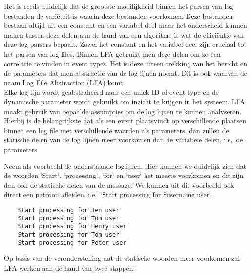 Het is reeds duidelijk dat de grootste moeilijkheid binnen het parsen van log bestanden de variëteit is waarin deze bestanden voorkomen. Deze bestanden bestaan altijd uit een constant en een variabel deel maar het onderscheid kunnen maken tussen deze delen aan de hand van een algoritme is wat de efficiëntie van deze log parsers bepaalt. Zowel het constant en het variabel deel zijn cruciaal tot het parsen van log files. Binnen LFA gebruikt men deze delen om zo een correlatie te vinden in event types. Het is deze uiteen trekking van het bericht en de parameters dat men abstractie van de log lijnen noemt. Dit is ook waarvan de naam Log File Abstraction (LFA) komt.\\

Elke log lijn wordt geabstraheerd naar een uniek ID of event type en de dynamische parameter wordt gebruikt om inzicht te krijgen in het systeem. LFA maakt gebruik van bepaalde assumpties om de log lijnen te kunnen analyseren. Hierbij is de belangrijkste dat als een event plaatsvindt op verschillende plaatsen binnen een log file met verschillende waarden als parameters, dan zullen de statische delen van de log lijnen meer voorkomen dan de variabele delen, i.e.\ de parameters.

Neem als voorbeeld de onderstaande loglijnen. Hier kunnen we duidelijk zien dat de woorden `Start`, `processing`, `for` en `user` het meeste voorkomen en dit zijn dan ook de statische delen van de message. We kunnen uit dit voorbeeld ook direct een patroon afleiden, i.e.\ `Start processing for \$username user`.\\
\begin{verbatim}
    Start processing for Jen user
    Start processing for Tom user
    Start processing for Henry user
    Start processing for Tom user
    Start processing for Peter user
\end{verbatim}

Op basis van de veronderstelling dat de statische woorden meer voorkomen zal LFA werken aan de hand van twee stappen:

